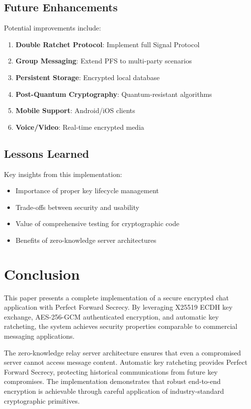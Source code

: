 \documentclass[conference]{IEEEtran}
\begin{document}
\subsection{Future Enhancements}

Potential improvements include:

\begin{enumerate}
    \item \textbf{Double Ratchet Protocol}: Implement full Signal Protocol
    \item \textbf{Group Messaging}: Extend PFS to multi-party scenarios
    \item \textbf{Persistent Storage}: Encrypted local database
    \item \textbf{Post-Quantum Cryptography}: Quantum-resistant algorithms
    \item \textbf{Mobile Support}: Android/iOS clients
    \item \textbf{Voice/Video}: Real-time encrypted media
\end{enumerate}

\subsection{Lessons Learned}

Key insights from this implementation:

\begin{itemize}
    \item Importance of proper key lifecycle management
    \item Trade-offs between security and usability
    \item Value of comprehensive testing for cryptographic code
    \item Benefits of zero-knowledge server architectures
\end{itemize}

\section{Conclusion}

This paper presents a complete implementation of a secure encrypted chat application with Perfect Forward Secrecy. By leveraging X25519 ECDH key exchange, AES-256-GCM authenticated encryption, and automatic key ratcheting, the system achieves security properties comparable to commercial messaging applications.

The zero-knowledge relay server architecture ensures that even a compromised server cannot access message content. Automatic key ratcheting provides Perfect Forward Secrecy, protecting historical communications from future key compromises. The implementation demonstrates that robust end-to-end encryption is achievable through careful application of industry-standard cryptographic primitives.
\end{document}
